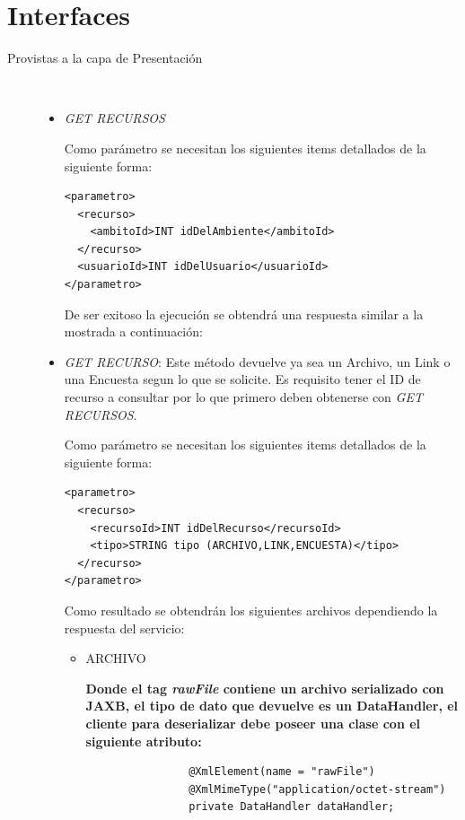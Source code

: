 \documentclass{article}
\begin{document}
\section{Interfaces}
	\begin{description}
		\item[Provistas a la capa de Presentaci\'on ] \
		\renewcommand{\labelitemi}{\ding{105}} 
		\begin{itemize}
		
\item \emph{GET RECURSOS}
	
Como par\'ametro se necesitan los siguientes items detallados de la siguiente forma:
				
\begin{lstlisting}
<parametro>
  <recurso>
    <ambitoId>INT idDelAmbiente</ambitoId>
  </recurso>
  <usuarioId>INT idDelUsuario</usuarioId>
</parametro>
\end{lstlisting}

De ser exitoso la ejecuci\'on se obtendr\'a una respuesta similar a la mostrada a continuación:

					
		
		\item \emph{GET RECURSO}:
			Este m\'etodo devuelve ya sea un Archivo, un Link o una Encuesta segun lo que se solicite. Es requisito tener el ID de recurso a consultar por lo que primero deben obtenerse con \emph{GET RECURSOS}.		

			Como par\'ametro se necesitan los siguientes items detallados de la siguiente forma:
				
\begin{lstlisting}
<parametro>
  <recurso>
    <recursoId>INT idDelRecurso</recursoId>
    <tipo>STRING tipo (ARCHIVO,LINK,ENCUESTA)</tipo>
  </recurso>
</parametro>
\end{lstlisting}
			
			\clearpage
			Como resultado se obtendr\'an los siguientes archivos dependiendo la respuesta del servicio:
			
		\begin{itemize}
			\item ARCHIVO 
			
				
			\textbf{Donde el tag \emph{rawFile} contiene un archivo serializado con JAXB, el tipo de dato que devuelve es un DataHandler, el cliente para deserializar debe poseer una clase con el siguiente atributo:} \newline
			\begin{verbatim}
				@XmlElement(name = "rawFile")
				@XmlMimeType("application/octet-stream")
				private DataHandler dataHandler;
			\end{verbatim}
			

\end{itemize}
\end{itemize}
\end{description}
\end{document}
